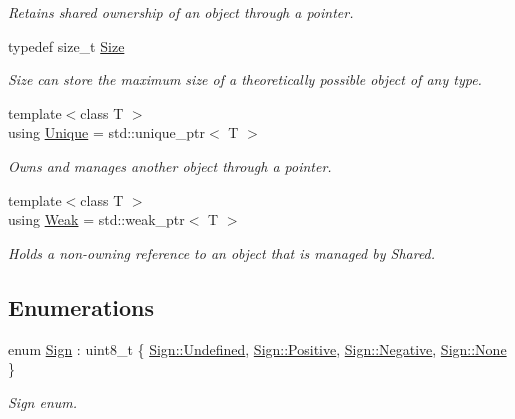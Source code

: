 \begin{DoxyCompactItemize}
\begin{DoxyCompactList}\small\item\em Retains shared ownership of an object through a pointer. \end{DoxyCompactList}\item 
typedef size\+\_\+t \mbox{\hyperlink{namespacelibrary_1_1core_1_1types_a701626ea1027888ebbb8cfd0ff7adab0}{Size}}
\begin{DoxyCompactList}\small\item\em Size can store the maximum size of a theoretically possible object of any type. \end{DoxyCompactList}\item 
{\footnotesize template$<$class T $>$ }\\using \mbox{\hyperlink{namespacelibrary_1_1core_1_1types_ac12d38691838fbc9a36765ee62ace52a}{Unique}} = std\+::unique\+\_\+ptr$<$ T $>$
\begin{DoxyCompactList}\small\item\em Owns and manages another object through a pointer. \end{DoxyCompactList}\item 
{\footnotesize template$<$class T $>$ }\\using \mbox{\hyperlink{namespacelibrary_1_1core_1_1types_a26c13c272f9fba4ce17ee4980be6703c}{Weak}} = std\+::weak\+\_\+ptr$<$ T $>$
\begin{DoxyCompactList}\small\item\em Holds a non-\/owning reference to an object that is managed by Shared. \end{DoxyCompactList}\end{DoxyCompactItemize}
\subsection*{Enumerations}
\begin{DoxyCompactItemize}
\item 
enum \mbox{\hyperlink{namespacelibrary_1_1core_1_1types_a06d9eaa410d43a0fa3f383040618e87d}{Sign}} \+: uint8\+\_\+t \{ \mbox{\hyperlink{namespacelibrary_1_1core_1_1types_a06d9eaa410d43a0fa3f383040618e87daec0fc0100c4fc1ce4eea230c3dc10360}{Sign\+::\+Undefined}}, 
\mbox{\hyperlink{namespacelibrary_1_1core_1_1types_a06d9eaa410d43a0fa3f383040618e87da3289297424e01eda5b788c083bbf3147}{Sign\+::\+Positive}}, 
\mbox{\hyperlink{namespacelibrary_1_1core_1_1types_a06d9eaa410d43a0fa3f383040618e87daffb9356ff2b7da85c75c92fa7ea03b8b}{Sign\+::\+Negative}}, 
\mbox{\hyperlink{namespacelibrary_1_1core_1_1types_a06d9eaa410d43a0fa3f383040618e87da6adf97f83acf6453d4a6a4b1070f3754}{Sign\+::\+None}}
 \}
\begin{DoxyCompactList}\small\item\em Sign enum. \end{DoxyCompactList}\end{DoxyCompactItemize}
